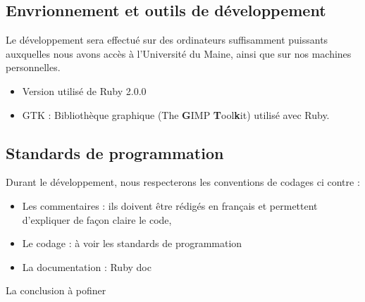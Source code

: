 \documentclass[11pt]{article}
\begin{document}
\subsection{Envrionnement et outils de développement}

Le développement sera effectué sur des ordinateurs suffisamment puissants auxquelles nous avons accès à l'Université du Maine, ainsi que sur nos machines personnelles.

\begin{itemize}
		\item Version utilisé de Ruby 2.0.0
		\item GTK : Bibliothèque graphique (The \textbf{G}IMP \textbf{T}ool\textbf{k}it) utilisé avec Ruby.
\end{itemize}

\subsection{Standards de programmation}

Durant le développement, nous respecterons les conventions de codages ci contre : 

\begin{itemize}
	\item Les commentaires : ils doivent être rédigés en français et permettent d'expliquer de façon claire le code,
	\item Le codage : à voir les standards de programmation
	\item La documentation : Ruby doc 
\end{itemize}


\newpage

La conclusion à pofiner 
\end{document}
